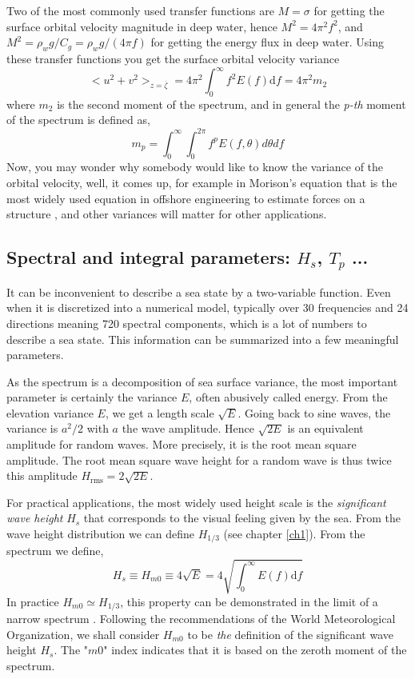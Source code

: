 Two of the most commonly used transfer functions are $M=\sigma$ for getting the surface orbital velocity magnitude in deep water, hence $M^2=4\pi^2 f^2$, and $M^2=\rho_w g/C_g=\rho_w g/(4 \pi f)$ for getting the energy flux in deep water. Using these transfer functions you get the surface orbital velocity variance 
\begin{equation}
<u^2+v^2>_{z=\overline{\zeta}}   =4\pi^2  \int_{0}^{\infty}  f^{2} E(f) {\mathrm d}f = 4\pi^2 m_2
\label{eq:moment_def}
\end{equation}
where $m_2$ is the second moment of the spectrum, and in general the  \textit{p-th} moment of the spectrum is defined as,
\begin{equation}
m_{p} = \int_{0}^{\infty}\int_{0}^{2\pi} f^{p} E(f,\theta)d\theta df
\label{eq:moment_def}
\end{equation}
Now, you may wonder why somebody would like to know the variance of the orbital velocity, well, it comes up, for example in Morison's equation that is the most widely used equation in offshore engineering to estimate forces on a structure \citep{Boccotti2000}, and other variances will matter for other applications. 

\subsection{Spectral and integral parameters: $H_s$, $T_p$ ...}\label{sub:param}
It can
be inconvenient  to describe a sea state by a two-variable function. Even when it is discretized into a numerical model,  typically 
over 30 frequencies and 24 directions meaning 720 spectral components, which is a lot of numbers to describe a sea state. This information can be 
summarized into a few meaningful parameters.

As the spectrum is a decomposition of sea surface variance, the most important parameter is certainly the variance $E$, often abusively called
energy. From the elevation variance $E$, we get a length scale  $\sqrt{E}$. Going back to sine waves, the variance is $a^2/2$ with $a$ the wave amplitude. Hence $\sqrt{2 E}$
is an equivalent amplitude  for random waves. More precisely, it is 
the root mean square amplitude. The root mean square wave height for a random wave is thus twice this amplitude
$H_{\mathrm{rms}}=2 \sqrt{2E}$.

For practical applications, the most widely used height scale is the \textit{significant wave height} $H_s$ that corresponds to the visual 
feeling given by the sea. From the wave height distribution we can define $H_{1/3}$ (see chapter \ref{ch1}). From the spectrum we define,
\begin{equation}
H_s \equiv H_{m0}\equiv 4 \sqrt{E} = 4 \sqrt{\int_{0}^{\infty} E(f) {\mathrm d}f}
\label{eq3.14}
\end{equation}
In practice $H_{m0} \simeq H_{1/3}$, this property can be demonstrated in the limit of a narrow spectrum \citep{Longuet-Higgins1952}. Following the recommendations of 
the World Meteorological Organization, 
we shall consider $H_{m0}$ to be \emph{the} definition of the significant wave height $H_s$. The "$m0$" index indicates that it is based on the zeroth moment of the spectrum. 


